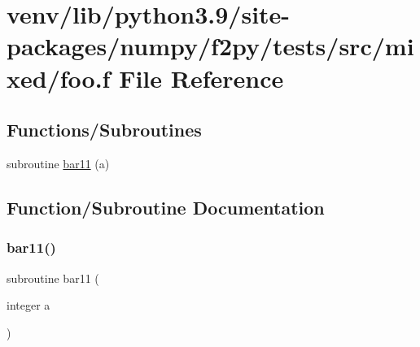 \hypertarget{foo_8f}{}\section{venv/lib/python3.9/site-\/packages/numpy/f2py/tests/src/mixed/foo.f File Reference}
\label{foo_8f}
\subsection*{Functions/\+Subroutines}
\begin{DoxyCompactItemize}
\item 
subroutine \hyperlink{foo_8f_a02f10571fb57f66099dc561fc4709bf6}{bar11} (a)
\end{DoxyCompactItemize}


\subsection{Function/\+Subroutine Documentation}
\mbox{\label{foo_8f_a02f10571fb57f66099dc561fc4709bf6}} 
\subsubsection{\texorpdfstring{bar11()}{bar11()}}
{\footnotesize\ttfamily subroutine bar11 (\begin{DoxyParamCaption}\item[{integer}]{a }\end{DoxyParamCaption})}

